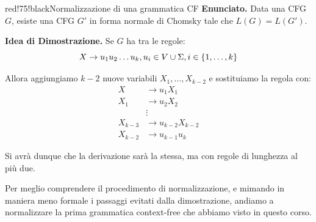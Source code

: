 \begin{halfframedbox}{red!75!black}{Normalizzazione di una grammatica CF}
  \textbf{Enunciato.} Data una CFG $G$, esiste una CFG $G'$ in forma normale di Chomsky tale che $L(G) = L(G')$.

  \begin{center}
    \textcolor{red!75!black}{\hdashrule[0.5ex]{18cm}{1pt}{3mm 3pt 1mm 2pt}}
  \end{center}

  \textbf{Idea di Dimostrazione.} Se $G$ ha tra le regole:
  \begin{equation}
    X \to u_1u_2\ldots u_k, u_i \in V \cup \Sigma, i \in \displaystyle{\left\{{1, \ldots, k}\right\}}
  \end{equation}

  Allora aggiungiamo $k-2$ nuove variabili $X_1, \ldots, X_{k-2}$ e sostituiamo la regola con:
  \begin{equation}
    \begin{split}
      X &\to u_1X_1 \\
      X_1 &\to u_2X_2 \\
      &\vdots \\
      X_{k-3} &\to u_{k-2}X_{k-2} \\
      X_{k-2} &\to u_{k-1}u_k
    \end{split}
  \end{equation}

  Si avrà dunque che la derivazione sarà la stessa, ma con regole di lunghezza al più due.

\end{halfframedbox}

\newpage

Per meglio comprendere il procedimento di normalizzazione, e mimando in maniera meno formale i passaggi evitati dalla dimostrazione, andiamo a normalizzare la prima grammatica context-free che abbiamo visto in questo corso.

